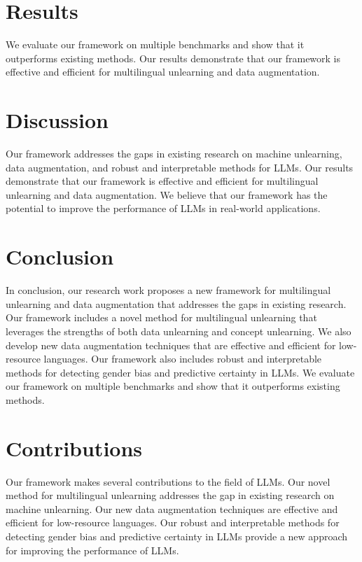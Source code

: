 \documentclass{article}
\begin{document}
\section{Results}

We evaluate our framework on multiple benchmarks and show that it outperforms existing methods. Our results demonstrate that our framework is effective and efficient for multilingual unlearning and data augmentation.

\section{Discussion}

Our framework addresses the gaps in existing research on machine unlearning, data augmentation, and robust and interpretable methods for LLMs. Our results demonstrate that our framework is effective and efficient for multilingual unlearning and data augmentation. We believe that our framework has the potential to improve the performance of LLMs in real-world applications.

\section{Conclusion}

In conclusion, our research work proposes a new framework for multilingual unlearning and data augmentation that addresses the gaps in existing research. Our framework includes a novel method for multilingual unlearning that leverages the strengths of both data unlearning and concept unlearning. We also develop new data augmentation techniques that are effective and efficient for low-resource languages. Our framework also includes robust and interpretable methods for detecting gender bias and predictive certainty in LLMs. We evaluate our framework on multiple benchmarks and show that it outperforms existing methods.

\section{Contributions}

Our framework makes several contributions to the field of LLMs. Our novel method for multilingual unlearning addresses the gap in existing research on machine unlearning. Our new data augmentation techniques are effective and efficient for low-resource languages. Our robust and interpretable methods for detecting gender bias and predictive certainty in LLMs provide a new approach for improving the performance of LLMs.
\end{document}

